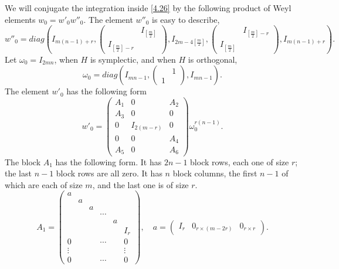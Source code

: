 \documentclass[12pts]{amsart}
\newcommand{\I}{{\mathrm{I}}}
\begin{document}
We will conjugate the integration inside \eqref{4.26} by the
following product of Weyl elements $w_0=w'_0w''_0$. The element $w''_0$ is easy to describe,
\begin{equation}\label{6.0}
w''_0=diag(I_{m(n-1)+r},\begin{pmatrix}&I_{[\frac{m}{2}]}\\I_{[\frac{m}{2}]-r}\end{pmatrix},I_{2m-4[\frac{m}{2}]},\begin{pmatrix}&I_{[\frac{m}{2}]-r}\\I_{[\frac{m}{2}]}\end{pmatrix}, I_{m(n-1)+r}).
\end{equation}
Let $\omega_0=I_{2mn}$, when $H$ is symplectic, and when $H$ is orthogonal,
\begin{equation}\label{6.0'}
\omega_0=diag(I_{mn-1},\begin{pmatrix}&1\\1\end{pmatrix},I_{mn-1}).
\end{equation}
The element $w'_0$ has the following form
\begin{equation}\label{6.1}
w'_0=\begin{pmatrix}A_1&0&A_2\\A_3&0&0\\0&I_{2(m-r)}&0\\0&0&A_4\\ A_5&0&A_6\end{pmatrix}\omega_0^{r(n-1)}.
\end{equation}
The block $A_1$ has the following form. It has $2n-1$ block rows,
each one of size $r$; the last $n-1$ block rows are all zero. It has
$n$ block columns, the first $n-1$ of which are each of size $m$,
and the last one is of size $r$.
\begin{equation}\label{6.2}
A_1=\begin{pmatrix}a\\&a\\&&a\\&&&\cdots\\&&&&a\\&&&&&I_r\\0&&&\cdots
&&0\\ \vdots &&&&&\vdots\\ 0&&&\cdots &&0\end{pmatrix},\quad
a=\begin{pmatrix}I_r&0_{r\times (m-2r)}&0_{r\times r}\end{pmatrix}.
\end{equation}
\end{document}
